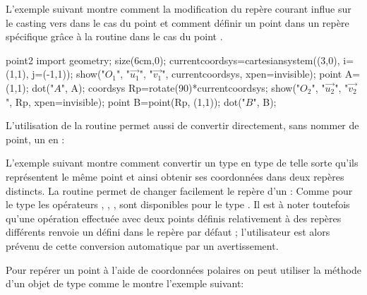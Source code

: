 \documentclass[pdftex]{article}
\begin{document}
L'exemple suivant montre comment la modification du repère
courant influe sur le \og{}casting\fg{}  vers 
dans le cas du point  et comment définir un point dans un repère spécifique grâce à la
routine 
 dans le cas du point .
\begin{vasy}{point2}
  import geometry;
  size(6cm,0);
  currentcoordsys=cartesiansystem((3,0), i=(1,1), j=(-1,1));
  show("$O_1$", "$\vec{u_1}$", "$\vec{v_1}$", currentcoordsys, xpen=invisible);
  point A=(1,1);
  dot("$A$", A);
  coordsys Rp=rotate(90)*currentcoordsys;
  show("$O_2$", "$\vec{u_2}$", "$\vec{v_2}$", Rp, xpen=invisible);
  point B=point(Rp, (1,1));
  dot("$B$", B);
\end{vasy}
L'utilisation de la routine  permet aussi de
convertir directement, sans nommer de point, un  en
:

L'exemple suivant montre comment convertir un type  en type
 de telle sorte qu'ils représentent le même point et ainsi
obtenir ses coordonnées dans deux repères distincts.
La routine
permet de changer facilement le repère d'un :
Comme pour le type  les opérateurs \code{+}, \code{-},
\code{*}, \code{/} sont disponibles pour le type . Il est à
noter toutefois qu'une opération effectuée avec deux
points définis relativement à des repères différents renvoie un
 défini dans le repère par défaut
; l'utilisateur est alors prévenu de cette
conversion automatique par un avertissement.

Pour repérer un point à l'aide de coordonnées polaires on peut
utiliser la méthode\linebreak{} d'un
objet de type  comme le montre l'exemple suivant:
\end{document}
